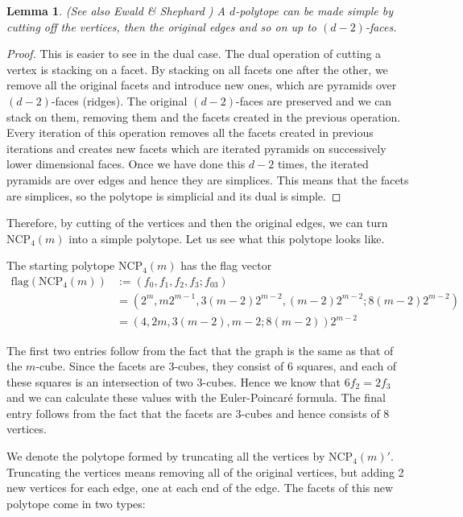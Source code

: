 \documentclass[a4paper,12pt]{book}
\theoremstyle{plain}
\newtheorem{lemma}[theorem]{Lemma}
\theoremstyle{definition}
\newcommand\NC{\textrm{NCP}}
\begin{document}
 

\begin{lemma}
(See also Ewald \& Shephard \cite{EwSh}) A $d$-polytope can be made simple 
by cutting off the vertices, then the original edges and so on up to $(d-2)$-faces.
\end{lemma}

\begin{proof}
This is easier to see in the dual case. The dual operation of cutting a vertex 
is stacking on a facet. By stacking on all facets one after the other, we 
remove all the original facets and introduce new ones, which are pyramids over 
$(d-2)$-faces (ridges). The original $(d-2)$-faces are preserved and we can stack on 
them, removing them and the facets created in the previous operation. Every 
iteration of this operation removes all the facets created in previous 
iterations and creates new facets which are iterated pyramids on successively 
lower dimensional faces. Once we have done this $d-2$ times, the iterated 
pyramids are over edges and hence they are simplices. This means that the facets are 
simplices, so the polytope is simplicial and its dual is simple.
\end{proof}

Therefore, by cutting of the vertices and then the original edges, we can turn $\NC_4(m)$ into a simple 
polytope. Let us see what this polytope looks like. 

The starting polytope $\NC_4(m)$ has the flag vector 
\begin{align*}
 \textrm{flag}(\NC_4(m)) &:= (f_0, f_1, f_2, f_3; f_{03}) \\
	&= (2^m, m2^{m-1}, 3(m-2)2^{m-2}, (m-2)2^{m-2}; 8(m-2)2^{m-2}) \\
	&= (4, 2m, 3(m-2), m-2; 8(m-2))2^{m-2}
\end{align*}

The first two entries follow from the fact that the graph is the same as that 
of the $m$-cube. Since the facets are 3-cubes, they 
consist of 6 squares, and each of these squares is an intersection of two 
3-cubes. Hence we know that $6f_2 = 2f_3$ and we can calculate these values with 
the Euler-Poincar\'{e} formula. The final entry follows from the fact that the facets are 
3-cubes and hence consists of 8 vertices.

We denote the polytope formed by truncating all the vertices by $\NC_4(m)'$.
Truncating the vertices means removing all of the original vertices, but 
adding 2 new vertices for each edge, one at each end of the edge. The facets of this new 
polytope come in two types:
\end{document}
